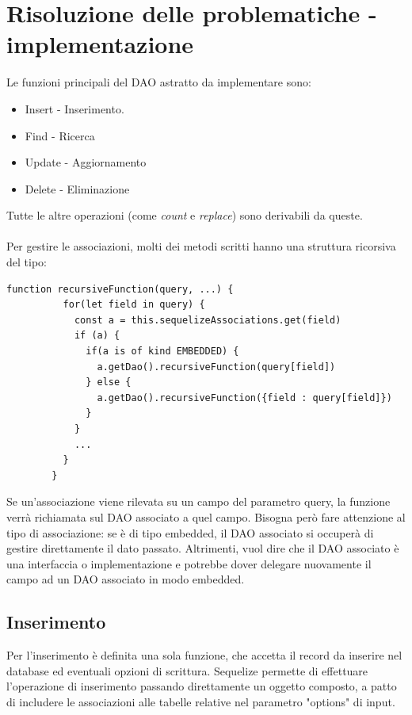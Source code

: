 \documentclass[a4paper, 12pt]{report}
\begin{document}
    \section{Risoluzione delle problematiche - implementazione}
      Le funzioni principali del DAO astratto da implementare sono:
      \begin{itemize}
        \item Insert - Inserimento.
        \item Find   - Ricerca
        \item Update - Aggiornamento
        \item Delete - Eliminazione
      \end{itemize}
      Tutte le altre operazioni (come \emph{count} e \emph{replace}) sono derivabili da queste.
      \paragraph*{}
      Per gestire le associazioni, molti dei metodi scritti hanno una struttura ricorsiva del tipo:
      \begin{Verbatim}[samepage=true]
        function recursiveFunction(query, ...) {
          for(let field in query) {
            const a = this.sequelizeAssociations.get(field)
            if (a) {
              if(a is of kind EMBEDDED) {
                a.getDao().recursiveFunction(query[field])
              } else {
                a.getDao().recursiveFunction({field : query[field]})
              }
            }
            ...
          }
        }
      \end{Verbatim}
      Se un'associazione viene rilevata su un campo del parametro query, la funzione verrà richiamata sul DAO associato a quel campo. 
      Bisogna però fare attenzione al tipo di associazione: se è di tipo embedded, il DAO associato si occuperà di gestire direttamente il dato passato. Altrimenti, vuol dire che il DAO associato è una interfaccia o implementazione e potrebbe dover
      delegare nuovamente il campo ad un DAO associato in modo embedded.
    \subsection{Inserimento}
      Per l'inserimento è definita una sola funzione, che accetta il record da inserire nel database ed eventuali opzioni di scrittura.
      Sequelize permette di effettuare l'operazione di inserimento passando direttamente un oggetto composto, a patto di includere le associazioni alle tabelle relative
      nel parametro "options" di input.
\end{document}
